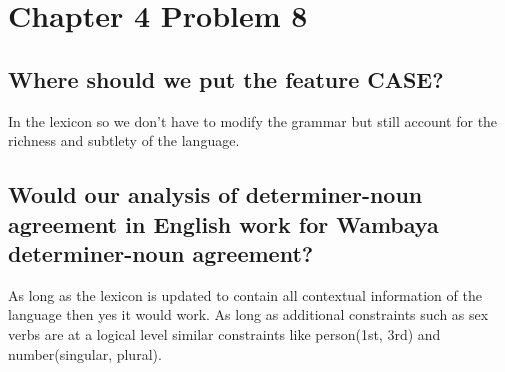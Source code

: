 \documentclass{article}
\begin{document}
\section{Chapter 4 Problem 8}
\subsection{Where should we put the feature CASE?}
In the lexicon so we don't have to modify the grammar but still account for the richness and subtlety of the language.
\subsection{Would our analysis of determiner-noun agreement
in English work for Wambaya determiner-noun agreement?}
As long as the lexicon is updated to contain all contextual information of the language then yes it would work. As long as additional constraints such as sex verbs are at a logical level similar constraints like person(1st, 3rd) and number(singular, plural).
\end{document}
